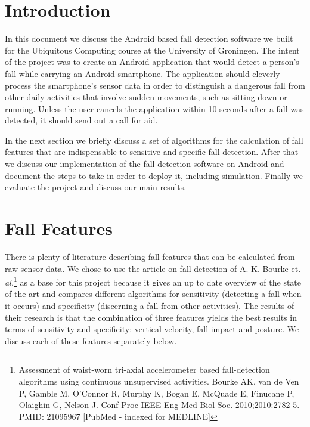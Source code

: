 %
%
%
%
%
%
%
%
%
%
%
%
%
%
%
%
%
%
%
%
%
%
%
%
%
%
%
%
%
%
%
%
%
%
%
%
%
%
%
%
%
%
%
%
%
%
%
%
%
%
%
%
%
%
%
%
%
%
%
%
%
%
%
%
%
%
%
%
%
%
%
%
%
%
%
%
%
%
%
%
%
%
%
%

\ifpdf
{}
\else
{}
\fi

\maketitle

\section{Introduction}
In this document we discuss the Android based fall detection software we built for the Ubiquitous Computing course at the University of Groningen. The intent of the project was to create an Android application that would detect a person's fall while carrying an Android smartphone. The application should cleverly process the smartphone's sensor data in order to distinguish a dangerous fall from other daily activities that involve sudden movements, such as sitting down or running. Unless the user cancels the application within 10 seconds after a fall was detected, it should send out a call for aid.

In the next section we briefly discuss a set of algorithms for the calculation of fall features that are indispensable to sensitive and specific fall detection. After that we discuss our implementation of the fall detection software on Android and document the steps to take in order to deploy it, including simulation. Finally we evaluate the project and discuss our main results.

\section{Fall Features}
There is plenty of literature describing fall features that can be calculated from raw sensor data. We chose to use the article on fall detection of A. K. Bourke et. \textit{al.}\footnote{Assessment of waist-worn tri-axial accelerometer based fall-detection algorithms using continuous unsupervised activities. Bourke AK, van de Ven P, Gamble M, O'Connor R, Murphy K, Bogan E, McQuade E, Finucane P, Olaighin G, Nelson J. Conf Proc IEEE Eng Med Biol Soc. 2010;2010:2782-5. PMID: 21095967 [PubMed - indexed for MEDLINE]} as a base for this project because it gives an up to date overview of the state of the art and compares different algorithms for sensitivity (detecting a fall when it occurs) and specificity (discerning a fall from other activities). The results of their research is that the combination of three features yields the best results in terms of sensitivity and specificity: vertical velocity, fall impact and posture. We discuss each of these features separately below.


